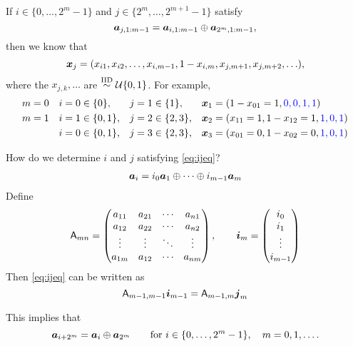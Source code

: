 \documentclass{amsart}
\begin{document}
If $i \in \{0, \ldots, 2^{m}-1\}$ and $j \in \{2^m, \ldots, 2^{m+1} - 1\}$ satisfy \begin{equation} \label{eq:ijeq}
    \boldsymbol{a}_{j,1:m-1} = \boldsymbol{a}_{i,1:m-1} \oplus \boldsymbol{a}_{2^m,1:m-1},
\end{equation}
then we know that
\begin{equation*}
    \boldsymbol{x}_{j} = (x_{i1}, x_{i2}, \ldots, x_{i,m-1}, 1-x_{i,m}, x_{j,m+1}, x_{j,m+2},\ldots),
\end{equation*}
where the $x_{j,k}, \ldots$ are $\overset{\textup{IID}}{\sim} \mathcal{U}\{0,1\}$.  For example, 
\begin{align*}
    m & = 0 & i &= 0 \in \{0\}, & j &= 1 \in \{1\}, 
    & \boldsymbol{x}_1 &= (1 - x_{01} = 1, {\color{blue}0, 0, 1, 1}) \\
    m & = 1 & i &= 1 \in \{0,1\}, & j &= 2 \in \{2,3\}, 
    & \boldsymbol{x}_2 &= (x_{11} = 1, 1 - x_{12} = 1, {\color{blue}1, 0, 1}) \\
    &  & i &= 0 \in \{0,1\}, & j &= 3 \in \{2,3\}, 
    & \boldsymbol{x}_3 &= (x_{01} = 0, 1 - x_{02} = 0, {\color{blue}1, 0, 1}) \\
\end{align*}

How do we determine $i$ and $j$ satisfying \eqref{eq:ijeq}?
\begin{align*}
    \boldsymbol{a}_{i} = i_0 \boldsymbol{a}_1 \oplus \cdots \oplus i_{m-1} \boldsymbol{a}_m
\end{align*}
Define
\begin{equation*}
    \mathsf{A}_{mn} = \begin{pmatrix}
        a_{11} & a_{21} & \cdots & a_{n1} \\
        a_{12} & a_{22} & \cdots & a_{n2} \\
        \vdots & \vdots & \ddots & \vdots \\
        a_{1m} & a_{12} & \cdots & a_{nm} 
    \end{pmatrix}, \qquad
    \boldsymbol{i}_m = \begin{pmatrix}i_0 \\ i_1 \\ \vdots \\ i_{m-1}\end{pmatrix}
\end{equation*}
Then \eqref{eq:ijeq} can be written as 
\begin{equation*}
    \mathsf{A}_{m-1,m-1} \boldsymbol{i}_{m-1} = \mathsf{A}_{m-1,m} \boldsymbol{j}_{m}
\end{equation*}


This implies that 
\begin{equation*}
    \boldsymbol{a}_{i+2^m} = \boldsymbol{a}_i \oplus \boldsymbol{a}_{2^m}  \qquad \text{for } i \in \{0, \ldots, 2^{m}-1\}, \quad m = 0, 1, \ldots.
\end{equation*}




\end{document}
